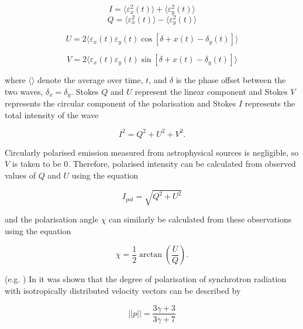 \begin{equation}
    I = \langle \varepsilon_x^2(t)\rangle + \langle\varepsilon_y^2(t)\rangle 
\end{equation}
\begin{equation}
     Q = \langle \varepsilon_x^2(t)\rangle - \langle\varepsilon_y^2(t)\rangle 
\end{equation}
   
\begin{equation}
    U = 2\langle \varepsilon_x(t)\varepsilon_y(t)\cos [\delta+x(t) - \delta_y(t)]\rangle
\end{equation}
    
\begin{equation}    
    V = 2\langle \varepsilon_x(t)\varepsilon_y(t)\sin [\delta+x(t) - \delta_y(t)]\rangle
\end{equation}

\noindent where $\langle\rangle$ denote the average over time, $t$, and $\delta$ is the phase offset between the two waves, $\delta_x=\delta_y$. Stokes $Q$ and $U$ represent the linear component and Stokes $V$ represents the circular component of the polarisation and Stokes $I$ represents the total intensity of the wave

\begin{equation}
    I^2 = Q^2+U^2+V^2.
\end{equation}

\noindent Circularly polarised emission measured from astrophysical sources is negligible, so $V$ is taken to be 0. Therefore, polarised intensity can be calculated from observed values of $Q$ and $U$ using the equation

\begin{equation}
    I_{pol} = \sqrt{Q^2+U^2}
\end{equation}

\noindent and the polarisation angle $\chi$ can similarly be calculated from these observations using the equation

\begin{equation}
    \chi = \frac{1}{2}\arctan \left(\frac{U}{Q}\right).
\end{equation}

\noindent (e.g. \cite{brown_2010}) In \cite{Roux} it was shown that the degree of polarisation of synchrotron radiation with isotropically distributed velocity vectors can be described by

\begin{equation}
    ||p|| = \frac{3\gamma +3}{3\gamma +7}
\end{equation}

